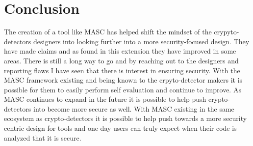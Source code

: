 \section{Conclusion}
\label{ch6:sec:conclusion}

The creation of a tool like MASC has helped shift the mindset of the crypyto-detectors designers into looking further into a more security-focused design. They have made claims and as found in this extension they have improved in some areas. There is still a long way to go and by reaching out to the designers and reporting flaws I have seen that there is interest in ensuring security. With the MASC framework existing and being known to the crpyto-detector makers it is possible for them to easily perform self evaluation and continue to improve. As MASC continues to expand in the future it is possible to help push crypto-detectors into become more secure as well. With MASC existing in the same ecosystem as crypto-detectors it is possible to help push towards a more security centric design for tools and one day users can truly expect when their code is analyzed that it is secure.
